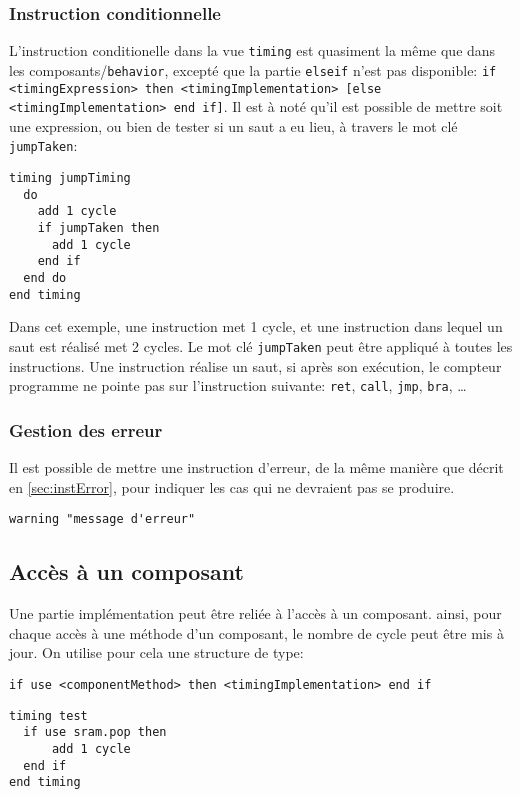 \subsubsection{Instruction conditionnelle}
L'instruction conditionelle dans la vue \texttt{timing} est quasiment la même que dans les composants/\texttt{behavior}, excepté que la partie \texttt{elseif} n'est pas disponible:
\texttt{if <timingExpression> then <timingImplementation> [else <timingImplementation> end if]}. Il est à noté qu'il est possible de mettre soit une expression, ou bien de tester si un saut a eu lieu, à travers le mot clé \texttt{jumpTaken}:

\begin{lstlisting}
timing jumpTiming
  do
    add 1 cycle
    if jumpTaken then
      add 1 cycle
    end if
  end do
end timing
\end{lstlisting}
Dans cet exemple, une instruction met 1 cycle, et une instruction dans lequel un saut est réalisé met 2 cycles. Le mot clé \texttt{jumpTaken} peut être appliqué à toutes les instructions. Une instruction réalise un saut, si après son exécution, le compteur programme ne pointe pas sur l'instruction suivante: \texttt{ret}, \texttt{call}, \texttt{jmp}, \texttt{bra}, \ldots

\subsubsection{Gestion des erreur}
Il est possible de mettre une instruction d'erreur, de la même manière que décrit en \ref{sec:instError}, pour indiquer les cas qui ne devraient pas se produire.

\begin{lstlisting}
warning "message d'erreur"
\end{lstlisting}

\subsection{Accès à un composant}
\label{sec:timingMethodAccess}
Une partie implémentation peut être reliée à l'accès à un composant. ainsi, pour chaque accès à une méthode d'un composant, le nombre de cycle peut être mis à jour. On utilise pour cela une structure de type:
\begin{verbatim}
if use <componentMethod> then <timingImplementation> end if 
\end{verbatim}
\begin{lstlisting}
timing test
  if use sram.pop then
      add 1 cycle
  end if
end timing
\end{lstlisting}

